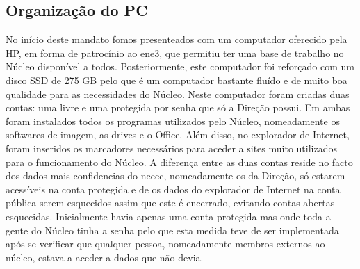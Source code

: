 
\subsection{Organização do PC}

No início deste mandato fomos presenteados com um computador oferecido pela HP, em forma de patrocínio ao \acrshort{ene3}, que permitiu ter uma base de trabalho no Núcleo disponível a todos. Posteriormente, este computador foi reforçado com um disco SSD de 275 GB pelo que é um computador bastante fluído e de muito boa qualidade para as necessidades do Núcleo. Neste computador foram criadas duas contas: uma livre e uma protegida por senha que só a Direção possui. Em ambas foram instalados todos os programas utilizados pelo Núcleo, nomeadamente os softwares de imagem, as drives e o Office. Além disso, no explorador de Internet, foram inseridos os marcadores necessários para aceder a sites muito utilizados para o funcionamento do Núcleo. A diferença entre as duas contas reside no facto dos dados mais confidencias do \acrshort{neeec}, nomeadamente os da Direção, só estarem acessíveis na conta protegida e de os dados do explorador de Internet na conta pública serem esquecidos assim que este é encerrado, evitando contas abertas esquecidas. Inicialmente havia apenas uma conta protegida mas onde toda a gente do Núcleo tinha a senha pelo que esta medida teve de ser implementada após se verificar que qualquer pessoa, nomeadamente membros externos ao núcleo, estava a aceder a dados que não devia.